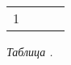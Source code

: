 \begin{center}
    \hypertarget{table3}{}

    \renewcommand{\arraystretch}{1.8}

    \begin{tabular}{|c|C{2.5cm}|C{2.5cm}|C{1.8cm}|}
        \hline
         &  &  &   \\
         &    &    &                        \\
        \hline
    \end{tabular}

    \smallvspace

    \textit{Таблица .} 

\end{center}